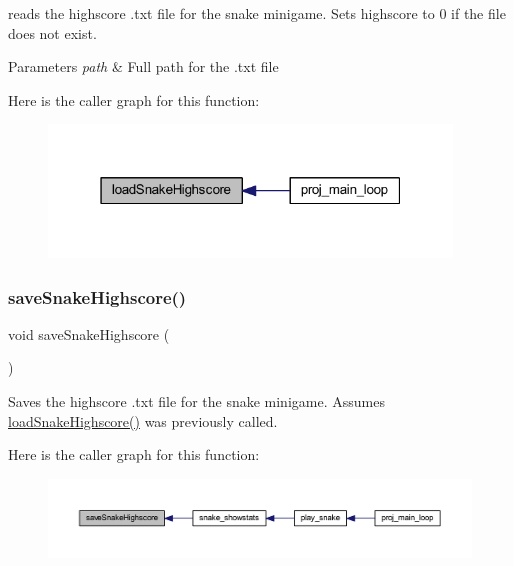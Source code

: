 reads the highscore .txt file for the snake minigame. Sets highscore to 0 if the file does not exist. 


\begin{DoxyParams}{Parameters}
{\em path} & Full path for the .txt file \\
\hline
\end{DoxyParams}
Here is the caller graph for this function\+:\nopagebreak
\begin{figure}[H]
\begin{center}
\leavevmode
\includegraphics[width=304pt]{group__snake_gab02c25b496104c83c594be691eb32683_icgraph}
\end{center}
\end{figure}
\mbox{\label{group__snake_gadc35d1670ccb56645328f13c424977eb}} 
\subsubsection{\texorpdfstring{save\+Snake\+Highscore()}{saveSnakeHighscore()}}
{\footnotesize\ttfamily void save\+Snake\+Highscore (\begin{DoxyParamCaption}{ }\end{DoxyParamCaption})}



Saves the highscore .txt file for the snake minigame. Assumes \mbox{\hyperlink{group__snake_gab02c25b496104c83c594be691eb32683}{load\+Snake\+Highscore()}} was previously called. 

Here is the caller graph for this function\+:\nopagebreak
\begin{figure}[H]
\begin{center}
\leavevmode
\includegraphics[width=350pt]{group__snake_gadc35d1670ccb56645328f13c424977eb_icgraph}
\end{center}
\end{figure}
\mbox{\label{group__snake_gac6dab0ed48d449b3a7ab12cb1ce5087c}} 
